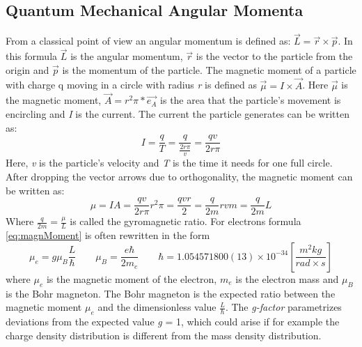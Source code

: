 \subsection{Quantum Mechanical Angular Momenta}
\label{sec:AngMom}


From a classical point of view an angular momentum is defined as: $\vec{L} = \vec{r} \times \vec{p}$. In this formula $\vec{L}$ is the angular momentum, $\vec{r}$ is the vector to the particle from the origin and $\vec{p}$ is the momentum of the particle. The magnetic moment of a particle with charge q moving in a circle with radius \textit{r} is defined as $\vec{\mu} = I \times \vec{A}$. Here $\vec{\mu}$ is the magnetic moment, $\vec{A} = r^{2}\pi * \vec{e_{A}}$ is the area that the particle's movement is encircling and \textit{I} is the current. The current the particle generates can be written as:
\begin{equation}
 I = \frac{q}{T} = \frac{q}{\frac{2r\pi}{v}} = \frac{qv}{2r\pi}
\end{equation} 
Here, \textit{v} is the particle's velocity and \textit{T} is the time it needs for one full circle. After dropping the vector arrows due to orthogonality, the magnetic moment can be written as:
\begin{equation}
 \mu = IA = \frac{qv}{2r\pi}r^{2}\pi = \frac{qvr}{2} = \frac{q}{2m} rvm = \frac{q}{2m}L
 \label{eq:magnMoment}
\end{equation} 
Where $\frac{q}{2m} = \frac{\mu}{L}$ is called the gyromagnetic ratio. For electrons formula \ref{eq:magnMoment} is often rewritten in the form
\begin{equation}
 \mu_{e} = g\mu_{B}\frac{L}{\hbar} \hspace{2em} \mu_{B} = \frac{e\hbar}{2m_{e}} \hspace{2em} \hbar = 1.054571800(13)\times10^{-34} [\frac{m^{2}kg}{rad\times s}]
 \label{eq:mue}
\end{equation} 
where $\mu_{e}$ is the magnetic moment of the electron, $m_{e}$ is the electron mass and $\mu_{B}$ is the Bohr magneton. The Bohr magneton is the expected ratio between the magnetic moment $\mu_{e}$ and the dimensionless value $\frac{L}{\hbar}$. The \textit{g-factor} parametrizes deviations from the expected value \textit{g} = 1, which could arise if for example the charge density distribution is different from the mass density distribution.

